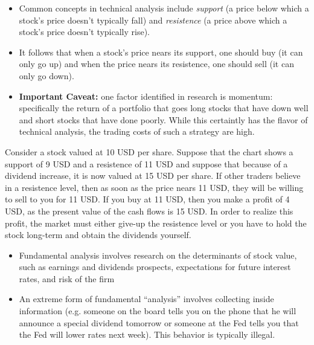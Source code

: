 \documentclass{beamer}
\begin{document}
\begin{frame}{}
	\begin{itemize}
		\item Common concepts in technical analysis include \textit{support} (a price below which a stock's price doesn't typically fall) and \textit{resistence} (a price above which a stock's price doesn't typically rise).  
		\item It follows that when a stock's price nears its support, one should buy (it can only go up) and when the price nears its resistence, one should sell (it can only go down).
		\item \textbf{Important Caveat:} one factor identified in research is momentum: specifically the return of a portfolio that goes long stocks that have down well and short stocks that have done poorly. While this certaintly has the flavor of technical analysis, the trading costs of such a strategy are high. 
	\end{itemize}
\end{frame}

\begin{frame}{}
	Consider a stock valued at 10 USD per share. Suppose that the chart shows a support of 9 USD and a resistence of 11 USD and suppose that because of a dividend increase, it is now valued at 15 USD per share. If other traders believe in a resistence level, then as soon as the price nears 11 USD, they will be willing to sell to you for 11 USD. If you buy at 11 USD, then you make a profit of 4 USD, as the present value of the cash flows is 15 USD. In order to realize this profit, the market must either give-up the resistence level or you have to hold the stock long-term and obtain the dividends yourself.
\end{frame}

\begin{frame}{}
	\begin{itemize}
		\item Fundamental analysis involves research on the determinants of stock value, such as earnings and dividends prospects, expectations for future interest rates, and risk of the firm 
		\item An extreme form of fundamental ``analysis'' involves collecting inside information (e.g. someone on the board tells you on the phone that he will announce a special dividend tomorrow or someone at the Fed tells you that the Fed will lower rates next week). This behavior is typically illegal.
	\end{itemize}
\end{frame}
\end{document}
